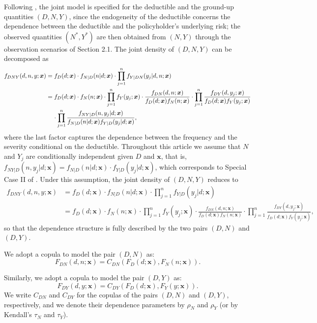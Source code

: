 \documentclass[11pt]{article}
\newcommand{\rev}[1]{{\color{blue}#1}}
\begin{document}
\rev{Following \citet{shi2022copula}, the joint model is specified for the deductible and the ground-up quantities $(D,N,Y)$, since the endogeneity of the deductible concerns the dependence between the deductible and the policyholder's underlying risk; the observed quantities $(N^*, Y^*)$ are then obtained from $(N,Y)$ through the observation scenarios of Section 2.1. The joint density of $(D,N,Y)$ can be decomposed as}
{\color{blue}
\begin{align*}
   f_{DNY}(d,n,y;\bm{x}) &= f_{D}(d;\bm{x})\cdot f_{N|D}(n|d;\bm{x})\cdot \prod_{j=1}^{n}f_{Y|DN}(y_j|d,n;\bm{x})\\
   & =f_D(d;\bm{x})\cdot f_{N}(n;\bm{x})\cdot \prod_{j=1}^{n}f_{Y}(y_j;\bm{x})\cdot\frac{f_{DN}(d,n;\bm{x})}{f_D(d;\bm{x})f_{N}(n;\bm{x})}\cdot \prod_{j=1}^{n}\frac{f_{DY}(d,y_j;\bm{x})}{f_D(d;\bm{x})f_{Y}(y_j;\bm{x})} \\
   & \hspace{0.4cm}\cdot \prod_{j=1}^{n}\frac{f_{NY|D}(n,y_j|d;\bm{x})}{f_{N|D}(n|d;\bm{x})f_{Y|D}(y_j|d;\bm{x})},
\end{align*}
}
\rev{where the last factor captures the dependence between the frequency and the severity conditional on the deductible. Throughout this article we assume that $N$ and $Y_j$ are conditionally independent given $D$ and $\bm{x}$, that is,
$f_{NY|D}(n,y_j|d;\bm{x})=f_{N|D}(n|d;\bm{x})\cdot f_{Y|D}(y_j|d;\bm{x})$, which corresponds to Special Case II of \citet{shi2022copula}. Under this assumption, the joint density of $(D,N,Y)$ reduces to}
{\color{blue}
\begin{align*}
   f_{DNY}(d,n,y;\bm{x}) &= f_{D}(d;\bm{x})\cdot f_{N|D}(n|d;\bm{x})\cdot \prod_{j=1}^{n}f_{Y|D}(y_j|d;\bm{x})\\
   & =f_D(d;\bm{x})\cdot f_{N}(n;\bm{x})\cdot \prod_{j=1}^{n}f_{Y}(y_j;\bm{x})\cdot\frac{f_{DN}(d,n;\bm{x})}{f_D(d;\bm{x})f_{N}(n;\bm{x})}\cdot \prod_{j=1}^{n}\frac{f_{DY}(d,y_j;\bm{x})}{f_D(d;\bm{x})f_{Y}(y_j;\bm{x})},
\end{align*}
}
\rev{so that the dependence structure is fully described by the two pairs $(D,N)$ and $(D,Y)$.}

We adopt a copula to model the pair \rev{$(D,N)$} as:
\begin{equation} \label{eq:FreqCopula}
	F_{DN}(d,n;\bm{x}) = C_{DN}(F_D(d;\bm{x}),F_{N}(n;\bm{x})).
\end{equation}

Similarly, we adopt a copula to model the pair \rev{$(D,Y)$} as:
\begin{equation}  \label{eq:SevCopula}
	F_{DY}(d,y;\bm{x}) = C_{DY}(F_D(d;\bm{x}),F_{Y}(y;\bm{x})).
\end{equation}
\rev{We write $C_{DN}$ and $C_{DY}$ for the copulas of the pairs $(D,N)$ and $(D,Y)$, respectively, and we denote their dependence parameters by $\rho_N$ and $\rho_Y$ (or by Kendall's $\tau_N$ and $\tau_Y$).}
\end{document}
